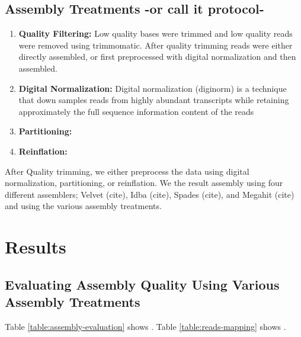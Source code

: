 \subsection*{Assembly Treatments -or call it protocol- }
\begin{enumerate}
 \item {\bf Quality Filtering:} Low quality bases were trimmed and low quality reads were removed using trimmomatic. After quality trimming reads were either directly assembled, or first
 preprocessed with digital normalization and then assembled.

 \item {\bf Digital Normalization:} Digital normalization (diginorm) is a technique that down samples reads from highly abundant transcripts while retaining
 approximately the full sequence information content of the reads \cite{Brown2012}
 \item {\bf Partitioning:} 
 \item {\bf Reinflation:}
\end{enumerate}

After Quality trimming, we either preprocess the data using digital normalization, partitioning, or reinflation. We the result assembly using four different assemblers; Velvet (cite), Idba (cite), Spades (cite), and Megahit (cite) and using the various assembly treatments. 

\section*{Results}

\subsection*{Evaluating Assembly  Quality Using Various Assembly Treatments}  %
Table \ref {table:assembly-evaluation}  shows .
Table \ref {table:reads-mapping} shows .


